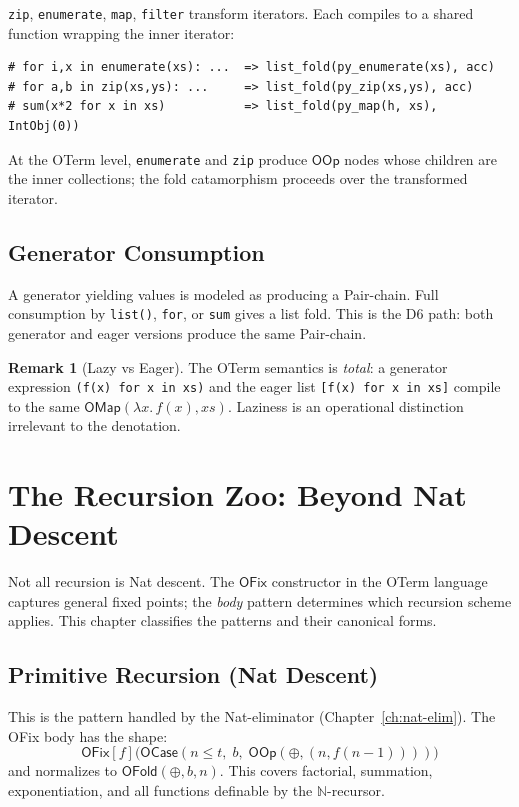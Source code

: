 \documentclass[11pt,a4paper]{report}
\theoremstyle{definition}
\newtheorem{remark}[definition]{Remark}
\theoremstyle{plain}
\newcommand{\Nat}{\mathbb{N}}
\begin{document}
\texttt{zip}, \texttt{enumerate}, \texttt{map}, \texttt{filter}
transform iterators.  Each compiles to a shared function wrapping the
inner iterator:
\begin{lstlisting}[caption={Composed iterators}]
# for i,x in enumerate(xs): ...  => list_fold(py_enumerate(xs), acc)
# for a,b in zip(xs,ys): ...     => list_fold(py_zip(xs,ys), acc)
# sum(x*2 for x in xs)           => list_fold(py_map(h, xs), IntObj(0))
\end{lstlisting}

At the OTerm level, \texttt{enumerate} and \texttt{zip} produce
$\mathsf{OOp}$ nodes whose children are the inner collections; the
fold catamorphism proceeds over the transformed iterator.

\section{Generator Consumption}

A generator yielding values is modeled as producing a Pair-chain.
Full consumption by \texttt{list()}, \texttt{for}, or \texttt{sum}
gives a list fold.  This is the D6 path: both generator and eager
versions produce the same Pair-chain.

\begin{remark}[Lazy vs Eager]
The OTerm semantics is \emph{total}: a generator expression
\texttt{(f(x) for x in xs)} and the eager list \texttt{[f(x) for x in xs]}
compile to the same $\mathsf{OMap}(\lambda x.\, f(x), xs)$.
Laziness is an operational distinction irrelevant to the denotation.
\end{remark}


\chapter{The Recursion Zoo: Beyond Nat Descent}
\label{ch:recursion-zoo}

Not all recursion is Nat descent.  The $\mathsf{OFix}$ constructor
in the OTerm language captures general fixed points; the \emph{body}
pattern determines which recursion scheme applies.  This chapter
classifies the patterns and their canonical forms.

\section{Primitive Recursion (Nat Descent)}

This is the pattern handled by the Nat-eliminator (Chapter~\ref{ch:nat-elim}).
The OFix body has the shape:
\[
  \mathsf{OFix}[f]\bigl(\mathsf{OCase}(n \leq t,\; b,\;
  \mathsf{OOp}(\oplus, (n, f(n{-}1))))\bigr)
\]
and normalizes to $\mathsf{OFold}(\oplus, b, n)$.  This covers
factorial, summation, exponentiation, and all functions definable by
the $\Nat$-recursor.
\end{document}
